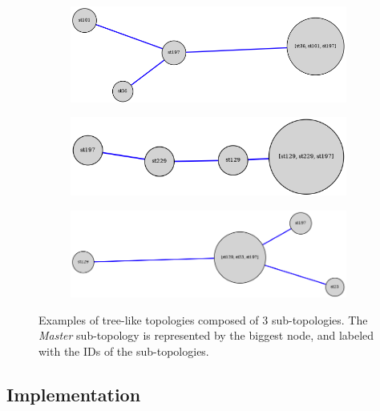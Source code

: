 \begin{figure}
  \centering
  \begin{subfigure}[b]{0.45\linewidth}
    \centering
    \includegraphics[width=\linewidth]{figures/graph3447.png}
  \end{subfigure}
  \hfill
  \begin{subfigure}[b]{0.45\linewidth}
    \centering
    \includegraphics[width=\linewidth]{figures/graph3452.png}
  \end{subfigure}
  \hfill
  \begin{subfigure}[b]{0.45\linewidth}
    \centering
    \includegraphics[width=\linewidth]{figures/graph3477.png}
  \end{subfigure}
  \caption{
    Examples of tree-like topologies composed of 3 sub-topologies.
    The \emph{Master} sub-topology is represented by the biggest node, and labeled with the IDs of the sub-topologies.
    \label{fig:topologies.trees}
  }
\end{figure}

\subsection{Implementation\label{sec:topologies.approach.implementation}}

